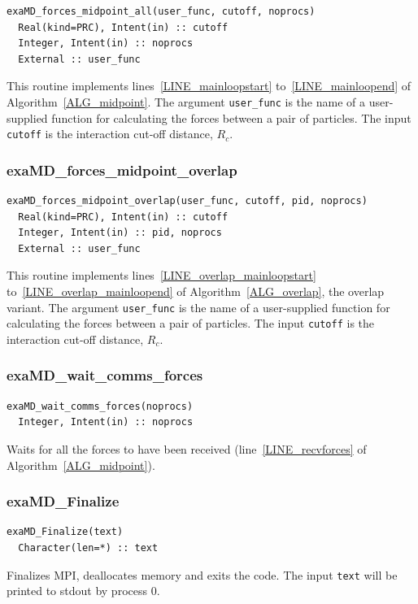 \documentclass[paper=a4, fontsize=11pt,bibtotoc]{scrartcl}		%
\newcommand{\TT}[1]{\texttt{#1}}
\begin{document}
\begin{verbatim}
exaMD_forces_midpoint_all(user_func, cutoff, noprocs)
  Real(kind=PRC), Intent(in) :: cutoff
  Integer, Intent(in) :: noprocs
  External :: user_func
\end{verbatim}
This routine implements lines~\ref{LINE_mainloopstart} to~\ref{LINE_mainloopend} of Algorithm~\ref{ALG_midpoint}. The argument \TT{user\_func} is the 
name of a user-supplied function for calculating the forces between a pair of particles. The input \TT{cutoff} is the interaction cut-off 
distance, $R_c$. 

\subsubsection{exaMD\_forces\_midpoint\_overlap}

\begin{verbatim}
exaMD_forces_midpoint_overlap(user_func, cutoff, pid, noprocs)
  Real(kind=PRC), Intent(in) :: cutoff
  Integer, Intent(in) :: pid, noprocs
  External :: user_func
\end{verbatim}
This routine implements lines~\ref{LINE_overlap_mainloopstart} to~\ref{LINE_overlap_mainloopend} of Algorithm~\ref{ALG_overlap}, the overlap variant. 
The argument \TT{user\_func} is the name of a user-supplied function for calculating the forces between a pair of particles. The input 
\TT{cutoff} is the interaction cut-off distance, $R_c$. 

\subsubsection{exaMD\_wait\_comms\_forces}

\begin{verbatim}
exaMD_wait_comms_forces(noprocs)
  Integer, Intent(in) :: noprocs
\end{verbatim}
Waits for all the forces to have been received (line~\ref{LINE_recvforces} of Algorithm~\ref{ALG_midpoint}).

\subsubsection{exaMD\_Finalize}

\begin{verbatim}
exaMD_Finalize(text)
  Character(len=*) :: text
\end{verbatim}
Finalizes MPI, deallocates memory and exits the code. The input \TT{text} will be printed to stdout by process 0.
\end{document}
